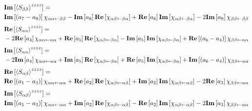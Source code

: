 \begin{align*}
	&\textbf{Im} \left[  \left \langle S_{\beta \beta} \right \rangle^{zzzz}  \right] =\\
	  &\textbf{Im} \left[ \left( a_7 - a_9 \right) \right]   \chi_{ \alpha \alpha \leftarrow \beta \beta } - \textbf{Im} \left[ a_8 \right] \textbf{Re} \left[ \chi_{\alpha \beta \leftarrow \beta \alpha} \right] + \textbf{Re} \left[ a_8 \right] \textbf{Im} \left[ \chi_{\alpha \beta \leftarrow \beta \alpha} \right]  - 2 \textbf{Im} \left[ a_9 \right]  \chi_{ \beta \beta \leftarrow \beta \beta}
\end{align*}
\begin{align*}
	&\textbf{Re} \left[ \left \langle S_{\alpha \alpha} \right \rangle^{zzzz}  \right] =\\
	 &-2  \textbf{Re} \left[ a_4 \right] \chi_{ \alpha \alpha \leftarrow \alpha \alpha}  + \textbf{Re} \left[ a_5 \right] \textbf{Re} \left[  \chi_{\alpha \beta \leftarrow \beta \alpha}  \right] - \textbf{Im} \left[ a_5 \right] \textbf{Im} \left[  \chi_{\alpha \beta \leftarrow \beta \alpha}  \right]+ \textbf{Re} \left[ \left( a_6 - a_4 \right) \right] \chi_{\beta \beta \leftarrow \alpha \alpha}
\end{align*}
\begin{align*}
	&\textbf{Im} \left[ \left \langle S_{\alpha \alpha} \right \rangle^{zzzz}  \right] =\\
	 &-2  \textbf{Im} \left[ a_4 \right] \chi_{ \alpha \alpha \leftarrow \alpha \alpha}  + \textbf{Im} \left[ a_5 \right] \textbf{Re} \left[  \chi_{\alpha \beta \leftarrow \beta \alpha}  \right] + \textbf{Re} \left[ a_5 \right] \textbf{Im} \left[  \chi_{\alpha \beta \leftarrow \beta \alpha}  \right]+ \textbf{Im} \left[ \left( a_6 - a_4 \right) \right] \chi_{\beta \beta \leftarrow \alpha \alpha}
\end{align*}
\begin{align*}
	&\textbf{Re} \left[ \left \langle S_{\alpha \beta} \right \rangle^{zzzz} \right] =\\
	  &\textbf{Re} \left[ \left( a_1 - a_3 \right)  \right] \chi_{\alpha \alpha \leftarrow \alpha \alpha} + \textbf{Re} \left[ a_2 \right] \textbf{Re} \left[  \chi_{\alpha \beta \leftarrow \alpha \beta} \right] +  \textbf{Im} \left[ a_2 \right] \textbf{Im} \left[  \chi_{\alpha \beta \leftarrow \alpha \beta} \right]- 2 \textbf{Re} \left[ a_3 \right]  \chi_{\beta \beta \leftarrow \alpha \alpha}
\end{align*}
\begin{align*}
	&\textbf{Im} \left[ \left \langle S_{\alpha \beta} \right \rangle^{zzzz} \right] =\\
	 &\textbf{Im} \left[ \left( a_1 - a_3 \right)  \right] \chi_{\alpha \alpha \leftarrow \alpha \alpha} + \textbf{Im} \left[ a_2 \right] \textbf{Re} \left[  \chi_{\alpha \beta \leftarrow \alpha \beta} \right] - \textbf{Re} \left[ a_2 \right] \textbf{Im} \left[  \chi_{\alpha \beta \leftarrow \alpha \beta} \right]- 2 \textbf{Im} \left[ a_3 \right]  \chi_{\beta \beta \leftarrow \alpha \alpha}
\end{align*}


